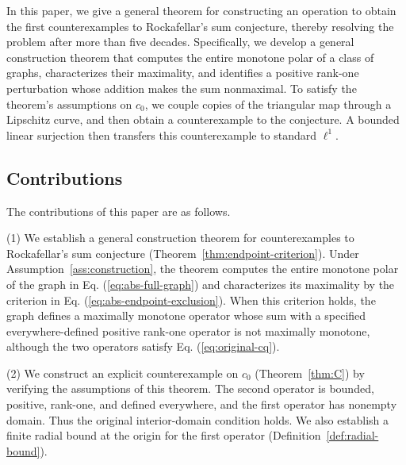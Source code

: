 \documentclass[11pt]{article}
\theoremstyle{definition}
\theoremstyle{remark}
\begin{document}

In this paper, we give a general theorem for constructing an operation to obtain the first counterexamples to Rockafellar's sum conjecture, thereby resolving the problem after more than five decades. 
Specifically, we develop a general construction theorem that computes the entire monotone polar of a class of graphs, characterizes their maximality, and identifies a positive rank-one perturbation whose addition makes the sum nonmaximal. To satisfy the theorem's assumptions on $c_0$, we couple copies of the triangular map through a Lipschitz curve, and then obtain a counterexample to the conjecture. A bounded linear surjection then transfers this counterexample to standard $\ell^1$.

\subsection{Contributions}
The contributions of this paper are as follows.

(1) We establish a general construction theorem for counterexamples to Rockafellar's sum conjecture (Theorem~\ref{thm:endpoint-criterion}). Under Assumption~\ref{ass:construction}, the theorem computes the entire monotone polar of the graph in Eq. (\ref{eq:abs-full-graph}) and characterizes its maximality by the criterion in Eq. (\ref{eq:abs-endpoint-exclusion}). When this criterion holds, the graph defines a maximally monotone operator whose sum with a specified everywhere-defined positive rank-one operator is not maximally monotone, although the two operators satisfy Eq. (\ref{eq:original-cq}).

(2) We construct an explicit counterexample on $c_0$ (Theorem~\ref{thm:C}) by verifying the assumptions of this theorem. The second operator is bounded, positive, rank-one, and defined everywhere, and the first operator has nonempty domain. Thus the original interior-domain condition holds. We also establish a finite radial bound at the origin for the first operator (Definition~\ref{def:radial-bound}).
\end{document}
